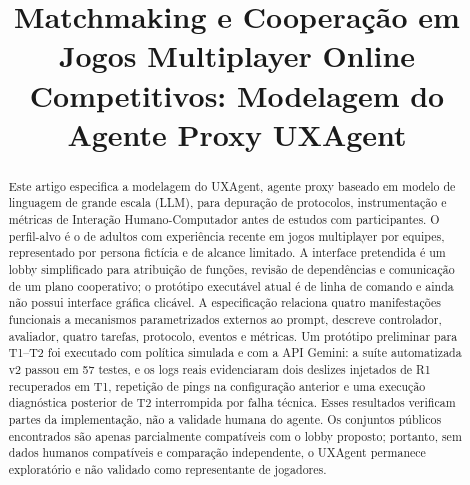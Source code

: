 \documentclass[conference]{IEEEtran}
\begin{document}
\title{Matchmaking e Cooperação em Jogos Multiplayer Online Competitivos: Modelagem do Agente Proxy UXAgent}

\author{
\and
{}
\and
{}
}

\maketitle

\begin{abstract}
Este artigo especifica a modelagem do UXAgent, agente proxy baseado em modelo de linguagem de grande escala (LLM), para depuração de protocolos, instrumentação e métricas de Interação Humano-Computador antes de estudos com participantes. O perfil-alvo é o de adultos com experiência recente em jogos multiplayer por equipes, representado por persona fictícia e de alcance limitado. A interface pretendida é um lobby simplificado para atribuição de funções, revisão de dependências e comunicação de um plano cooperativo; o protótipo executável atual é de linha de comando e ainda não possui interface gráfica clicável. A especificação relaciona quatro manifestações funcionais a mecanismos parametrizados externos ao prompt, descreve controlador, avaliador, quatro tarefas, protocolo, eventos e métricas. Um protótipo preliminar para T1--T2 foi executado com política simulada e com a API Gemini: a suíte automatizada v2 passou em 57 testes, e os logs reais evidenciaram dois deslizes injetados de R1 recuperados em T1, repetição de pings na configuração anterior e uma execução diagnóstica posterior de T2 interrompida por falha técnica. Esses resultados verificam partes da implementação, não a validade humana do agente. Os conjuntos públicos encontrados são apenas parcialmente compatíveis com o lobby proposto; portanto, sem dados humanos compatíveis e comparação independente, o UXAgent permanece exploratório e não validado como representante de jogadores.
\end{abstract}
\end{document}
